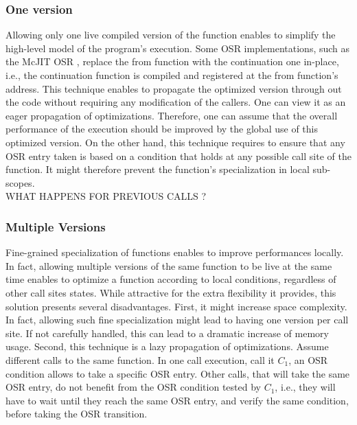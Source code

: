 \subsubsection{One version}
Allowing only one live compiled version of the function enables to simplify the high-level model of the program's execution.
Some OSR implementations, such as the McJIT OSR \cite{lameed2013modular}, replace the from function with the continuation one in-place, i.e., the continuation function is compiled and registered at the from function's address.
This technique enables to propagate the optimized version through out the code without requiring any modification of the callers.
One can view it as an eager propagation of optimizations.
Therefore, one can assume that the overall performance of the execution should be improved by the global use of this optimized version.
On the other hand, this technique requires to ensure that any OSR entry taken is based on a condition that holds at any possible call site of the function.
It might therefore prevent the function's specialization in local sub-scopes.\\ %
WHAT HAPPENS FOR PREVIOUS CALLS ?

\subsubsection{Multiple Versions}
Fine-grained specialization of functions enables to improve performances locally.
In fact, allowing multiple versions of the same function to be live at the same time enables to optimize a function according to local conditions, regardless of other call sites states.
While attractive for the extra flexibility it provides, this solution presents several disadvantages.
First, it might increase space complexity.
In fact, allowing such fine specialization might lead to having one version per call site.
If not carefully handled, this can lead to a dramatic increase of memory usage.
Second, this technique is a lazy propagation of optimizations.
Assume different calls to the same function.
In one call execution, call it $C_1$, an OSR condition allows to take a specific OSR entry.
Other calls, that will take the same OSR entry, do not benefit from the OSR condition tested by $C_1$, i.e., they will have to wait until they reach the same OSR entry, and verify the same condition, before taking the OSR transition.



